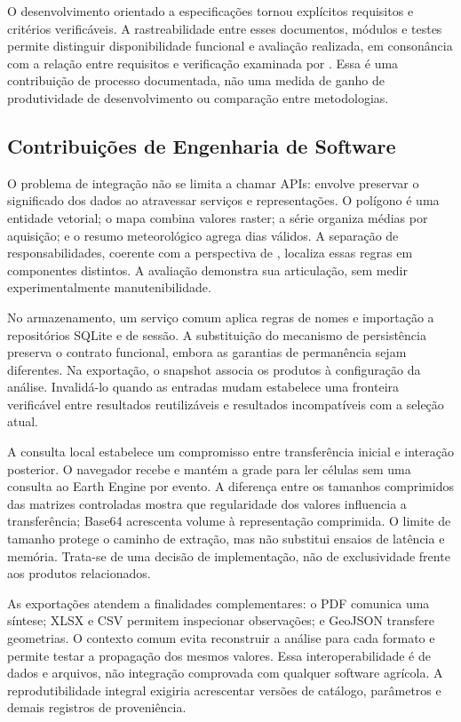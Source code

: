 O desenvolvimento orientado a especificações tornou explícitos requisitos e critérios verificáveis. A rastreabilidade entre esses documentos, módulos e testes permite distinguir disponibilidade funcional e avaliação realizada, em consonância com a relação entre requisitos e verificação examinada por \citet{GOTEL1994,BJARNASON2015}. Essa é uma contribuição de processo documentada, não uma medida de ganho de produtividade de desenvolvimento ou comparação entre metodologias.

\subsection{Contribuições de Engenharia de Software}

O problema de integração não se limita a chamar APIs: envolve preservar o significado dos dados ao atravessar serviços e representações. O polígono é uma entidade vetorial; o mapa combina valores raster; a série organiza médias por aquisição; e o resumo meteorológico agrega dias válidos. A separação de responsabilidades, coerente com a perspectiva de \citet{PARNAS1972}, localiza essas regras em componentes distintos. A avaliação demonstra sua articulação, sem medir experimentalmente manutenibilidade.

No armazenamento, um serviço comum aplica regras de nomes e importação a repositórios SQLite e de sessão. A substituição do mecanismo de persistência preserva o contrato funcional, embora as garantias de permanência sejam diferentes. Na exportação, o snapshot associa os produtos à configuração da análise. Invalidá-lo quando as entradas mudam estabelece uma fronteira verificável entre resultados reutilizáveis e resultados incompatíveis com a seleção atual.

A consulta local estabelece um compromisso entre transferência inicial e interação posterior. O navegador recebe e mantém a grade para ler células sem uma consulta ao Earth Engine por evento. A diferença entre os tamanhos comprimidos das matrizes controladas mostra que regularidade dos valores influencia a transferência; Base64 acrescenta volume à representação comprimida. O limite de tamanho protege o caminho de extração, mas não substitui ensaios de latência e memória. Trata-se de uma decisão de implementação, não de exclusividade frente aos produtos relacionados.

As exportações atendem a finalidades complementares: o PDF comunica uma síntese; XLSX e CSV permitem inspecionar observações; e GeoJSON transfere geometrias. O contexto comum evita reconstruir a análise para cada formato e permite testar a propagação dos mesmos valores. Essa interoperabilidade é de dados e arquivos, não integração comprovada com qualquer software agrícola. A reprodutibilidade integral exigiria acrescentar versões de catálogo, parâmetros e demais registros de proveniência.

